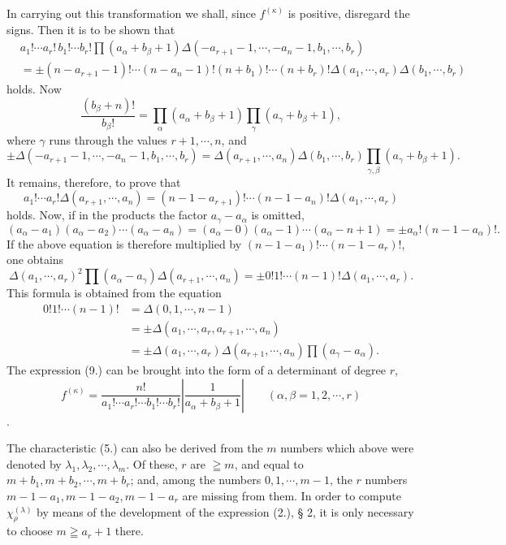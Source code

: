 \documentclass[11pt]{article}
\begin{document}
In carrying out this transformation we shall, since $f^{(\kappa)}$ is positive, disregard the signs. Then it is to be shown that
\[
\begin{aligned}
 &a_1!\cdots a_r!\,b_1!\cdots b_r!\prod(a_\alpha+b_\beta+1)
 \Delta(-a_{r+1}-1,\cdots,-a_n-1,b_1,\cdots,b_r)\\
 &=\pm (n-a_{r+1}-1)!\cdots(n-a_n-1)!(n+b_1)!\cdots(n+b_r)!
 \Delta(a_1,\cdots,a_r)\Delta(b_1,\cdots,b_r)
\end{aligned}
\]
holds. Now
\[
 \frac{(b_\beta+n)!}{b_\beta!}=\prod_\alpha(a_\alpha+b_\beta+1)\prod_\gamma(a_\gamma+b_\beta+1),
\]
where $\gamma$ runs through the values $r+1,
\cdots,n$, and
\[
 \pm\Delta(-a_{r+1}-1,
\cdots,-a_n-1,b_1,
\cdots,b_r)=\Delta(a_{r+1},
\cdots,a_n)\Delta(b_1,
\cdots,b_r)
 \prod_{\gamma,
\beta}(a_\gamma+b_\beta+1).
\]
It remains, therefore, to prove that
\[
 a_1!\cdots a_r!\Delta(a_{r+1},\cdots,a_n)=(n-1-a_{r+1})!\cdots(n-1-a_n)!\Delta(a_1,
\cdots,a_r)
\]
holds. Now, if in the products the factor $a_\gamma-a_\alpha$ is omitted,
\[
 (a_\alpha-a_1)(a_\alpha-a_2)\cdots(a_\alpha-a_n)=(a_\alpha-0)(a_\alpha-1)\cdots(a_\alpha-n+1)=\pm a_\alpha!(n-1-a_\alpha)!.
\]
If the above equation is therefore multiplied by $(n-1-a_1)!\cdots(n-1-a_r)!$, one obtains
\[
 \Delta(a_1,\cdots,a_r)^2\prod(a_\alpha-a_\gamma)\Delta(a_{r+1},\cdots,a_n)
 =\pm0!1!\cdots(n-1)!\Delta(a_1,\cdots,a_r).
\]
This formula is obtained from the equation
\[
\begin{aligned}
0!1!\cdots(n-1)!&=\Delta(0,1,\cdots,n-1)\\
&=\pm\Delta(a_1,\cdots,a_r,a_{r+1},\cdots,a_n)\\
&=\pm\Delta(a_1,\cdots,a_r)\Delta(a_{r+1},\cdots,a_n)\prod(a_\gamma-a_\alpha).
\end{aligned}
\]
The expression (9.) can be brought into the form of a determinant of degree $r$,
\begin{equation}\tag{9.}
 f^{(\kappa)}=\frac{n!}{a_1!\cdots a_r!\cdots b_1!\cdots b_r!}
 \left|\frac{1}{a_\alpha+b_\beta+1}\right|\qquad(\alpha,
\beta=1,2,
\cdots,r)
\end{equation}
.

The characteristic (5.) can also be derived from the $m$ numbers which above were denoted by $\lambda_1,
\lambda_2,
\cdots,
\lambda_m$. Of these, $r$ are $\geqq m$, and equal to $m+b_1,m+b_2,
\cdots,m+b_r$; and, among the numbers $0,1,
\cdots,m-1$, the $r$ numbers $m-1-a_1,m-1-a_2,m-1-a_r$ are missing from them. In order to compute $\chi_\rho^{(\lambda)}$ by means of the development of the expression (2.), § 2, it is only necessary to choose $m\geqq a_r+1$ there.
\end{document}

